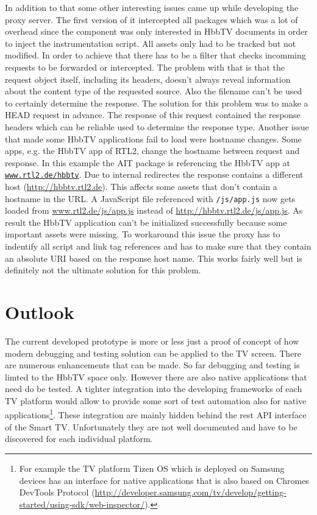 In addition to that some other interesting issues came up while developing the proxy server. The first version of it
intercepted all packages which was a lot of overhead since the component was only interested in HbbTV documents in
order to inject the instrumentation script. All assets only had to be tracked but not modified. In order to achieve
that there has to be a filter that checks incomming requests to be forwarded or intercepted. The problem with that is
that the request object itself, including its headers, doesn't always reveal information about the content type of the
requested source. Also the filename can't be used to certainly determine the response. The solution for this problem
was to make a HEAD request in advance. The response of this request contained the response headers which can be
reliable used to determine the response type. Another issue that made some HbbTV applications fail to load were
hostname changes. Some apps, e.g. the HbbTV app of RTL2, change the hostname between request and response. In this
example the AIT package is referencing the HbbTV app at \texttt{\url{www.rtl2.de/hbbtv}}. Due to internal redirectes
the response contains a different host (\url{http://hbbtv.rtl2.de}). This affects some assets that don't contain a
hostname in the URL. A JavaScript file referenced with \texttt{/js/app.js} now gets loaded from \url{www.rtl2.de/js/app.js}
instead of \url{http://hbbtv.rtl2.de/js/app.js}. As result the HbbTV application can't be initialized successfully
because some important assets were missing. To workaround this issue the proxy has to indentify all script and link tag
references and has to make sure that they contain an absolute URI based on the response host name. This works fairly
well but is definitely not the ultimate solution for this problem.

\section{Outlook\label{sec:outlook}}


The current developed prototype is more or less just a proof of concept of how modern debugging and testing solution
can be applied to the TV screen. There are numerous enhancements that can be made. So far debugging and testing is
limted to the HbbTV space only. However there are also native applications that need do be tested. A tighter integration
into the developing frameworks of each TV platform would allow to provide some sort of test automation also for native
applications\footnote{For example the TV platform Tizen OS which is deployed on Samsung devices has an interface for
native applications that is also based on Chromes DevTools Protocol (\url{http://developer.samsung.com/tv/develop/getting-started/using-sdk/web-inspector/}).}.
These integration are mainly hidden behind the rest API interface of the Smart TV. Unfortunately they are not well
documented and have to be discovered for each individual platform.

